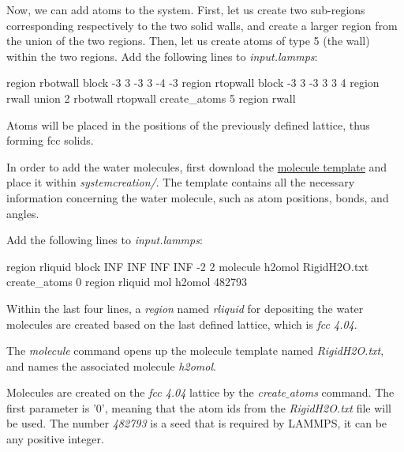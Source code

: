 \vspace{0.25cm} \noindent Now, we can add atoms to the system. First, let us create two
sub-regions corresponding respectively to the two solid
walls, and create a larger region from the union of the two
regions. Then, let us create atoms of type 5 (the wall) within the two
regions. Add the following lines to \textit{input.lammps}:

\begin{lcverbatim}
region rbotwall block -3 3 -3 3 -4 -3
region rtopwall block -3 3 -3 3 3 4
region rwall union 2 rbotwall rtopwall
create_atoms 5 region rwall
\end{lcverbatim}

\noindent Atoms will be placed in the positions of the previously
defined lattice, thus forming fcc solids.

\vspace{0.25cm} \noindent In order to add the water molecules, first
download the \href{https://lammpstutorials.github.io/lammpstutorials-inputs/level2/nanosheared-electrolyte/systemcreation/RigidH2O.txt}{molecule template}
and place it within \textit{systemcreation/}. The template contains all the
necessary information concerning the water molecule, such as
atom positions, bonds, and angles.

\vspace{0.25cm} \noindent Add the following lines to \textit{input.lammps}:

\begin{lcverbatim}
region rliquid block INF INF INF INF -2 2
molecule h2omol RigidH2O.txt
create_atoms 0 region rliquid mol h2omol 482793
\end{lcverbatim}

\noindent Within the last four lines, a \textit{region} named \textit{rliquid} for depositing the
water molecules are created based on the last defined lattice, which is \textit{fcc 4.04}. 

\vspace{0.25cm} \noindent The \textit{molecule} command opens up the molecule template named
\textit{RigidH2O.txt}, and names the associated molecule \textit{h2omol}.

\vspace{0.25cm} \noindent Molecules are created on the \textit{fcc 4.04} lattice
by the \textit{create$\_$atoms} command. The
first parameter is '0', meaning that the atom ids from the
\textit{RigidH2O.txt} file will be used.
The number \textit{482793} is a seed that is
required by LAMMPS, it can be any positive integer.

